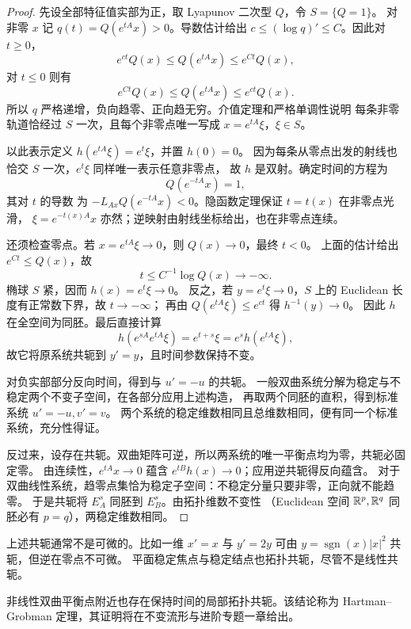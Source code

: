 \begin{proof}
先设全部特征值实部为正，取 Lyapunov 二次型 $Q$，令 $S=\{Q=1\}$。
对非零 $x$ 记 $q(t)=Q(e^{tA}x)>0$。导数估计给出
$c\leq (\log q)'\leq C$。因此对 $t\geq0$，
\[
 e^{ct}Q(x)\leq Q(e^{tA}x)\leq e^{Ct}Q(x),
\]
对 $t\leq0$ 则有 
\[
 e^{Ct}Q(x)\leq Q(e^{tA}x)\leq e^{ct}Q(x).
\]
所以 $q$ 严格递增，负向趋零、正向趋无穷。介值定理和严格单调性说明
每条非零轨道恰经过 $S$ 一次，且每个非零点唯一写成 $x=e^{tA}\xi$，$\xi\in S$。

以此表示定义 $h(e^{tA}\xi)=e^t\xi$，并置 $h(0)=0$。
因为每条从零点出发的射线也恰交 $S$ 一次，$e^t\xi$ 同样唯一表示任意非零点，
故 $h$ 是双射。确定时间的方程为 
\[
 Q(e^{-tA}x)=1,
\]
其对 $t$ 的导数
为 $-L_{Ax}Q(e^{-tA}x)<0$。隐函数定理保证 $t=t(x)$ 在非零点光滑，
$\xi=e^{-t(x)A}x$ 亦然；逆映射由射线坐标给出，也在非零点连续。

还须检查零点。若 $x=e^{tA}\xi\to0$，则 $Q(x)\to0$，最终 $t<0$。
上面的估计给出 $e^{Ct}\leq Q(x)$，故
\[
 t\leq C^{-1}\log Q(x)\to-\infty.
\]
椭球 $S$ 紧，因而 $h(x)=e^t\xi\to0$。
反之，若 $y=e^t\xi\to0$，$S$ 上的 Euclidean 长度有正常数下界，故 $t\to-\infty$；
再由 $Q(e^{tA}\xi)\leq e^{ct}$ 得 $h^{-1}(y)\to0$。
因此 $h$ 在全空间为同胚。最后直接计算
\[
 h(e^{sA}e^{tA}\xi)=e^{t+s}\xi=e^sh(e^{tA}\xi),
\]
故它将原系统共轭到 $y'=y$，且时间参数保持不变。

对负实部部分反向时间，得到与 $u'=-u$ 的共轭。
一般双曲系统分解为稳定与不稳定两个不变子空间，在各部分应用上述构造，
再取两个同胚的直积，得到标准系统 $u'=-u,v'=v$。
两个系统的稳定维数相同且总维数相同，便有同一个标准系统，充分性得证。

反过来，设存在共轭。双曲矩阵可逆，所以两系统的唯一平衡点均为零，共轭必固定零。
由连续性，$e^{tA}x\to0$ 蕴含 $e^{tB}h(x)\to0$；应用逆共轭得反向蕴含。
对于双曲线性系统，趋零点集恰为稳定子空间：不稳定分量只要非零，正向就不能趋零。
于是共轭将 $E_A^s$ 同胚到 $E_B^s$。由拓扑维数不变性
（Euclidean 空间 $\mathbb{R}^p,\mathbb{R}^q$ 同胚必有 $p=q$），两稳定维数相同。
\end{proof}
上述共轭通常不是可微的。比如一维 $x'=x$ 与 $y'=2y$ 可由
$y=\operatorname{sgn}(x)|x|^2$ 共轭，但逆在零点不可微。
平面稳定焦点与稳定结点也拓扑共轭，尽管不是线性共轭。

\begin{remark}[非线性情形的边界]
非线性双曲平衡点附近也存在保持时间的局部拓扑共轭。该结论称为 Hartman--Grobman 定理，其证明将在不变流形与进阶专题一章给出。
\end{remark}

